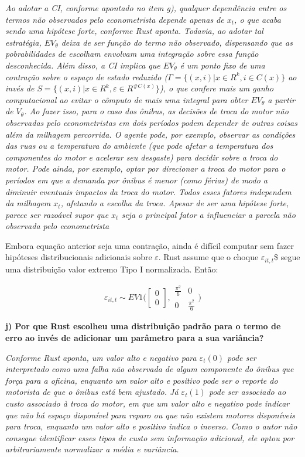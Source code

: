 \documentclass[12pt,a4paper]{article}
\begin{document}
\emph{Ao adotar a CI, conforme apontado no item g), qualquer dependência
entre os termos não observados pelo econometrista depende apenas de
\(x_t\), o que acaba sendo uma hipótese forte, conforme Rust aponta.
Todavia, ao adotar tal estratégia, \(EV_\theta\) deixa de ser função do
termo não observado, dispensando que as pobrabilidades de escolham
envolvam uma integração sobre essa função desconhecida. Além disso, a CI
implica que \(EV_\theta\) é um ponto fixo de uma contração sobre o
espaço de estado reduzido (\(\Gamma=\{(x,i)|x\in R^k, i \in C(x)\}\) ao
invés de \(S=\{(x,i)|x\in R^k, \varepsilon \in R^{\#C(x)}\}\)), o que
confere mais um ganho computacional ao evitar o cômputo de mais uma
integral para obter \(EV_\theta\) a partir de \(V_\theta\). Ao fazer
isso, para o caso dos ônibus, as decisões de troca do motor não
observadas pelo econometristas em dois períodos podem depender de outras
coisas além da milhagem percorrida. O agente pode, por exemplo, observar
as condições das ruas ou a temperatura do ambiente (que pode afetar a
temperatura dos componentes do motor e acelerar seu desgaste) para
decidir sobre a troca do motor. Pode ainda, por exemplo, optar por
direcionar a troca do motor para o períodos em que a demanda por ônibus
é menor (como férias) de modo a diminuir eventuais impactos da troca do
motor. Todos esses fatores independem da milhagem \(x_t\), afetando a
escolha da troca. Apesar de ser uma hipótese forte, parece ser razoável
supor que \(x_t\) seja o principal fator a influenciar a parcela não
observada pelo econometrista}

Embora equação anterior seja uma contração, ainda é difícil computar sem
fazer hipóteses distribucionais adicionais sobre \(\varepsilon\). Rust
assume que o choque \(\varepsilon_{it,t}\)\$ segue uma distribuição
valor extremo Tipo I normalizada. Então:

\[
\varepsilon_{it,t} \sim EV1 \Bigg( \begin{bmatrix} 
0   \\ 0 \end{bmatrix}, \begin{matrix} \frac{\pi^2}{6} & 0 \\ 0 & \frac{\pi^2}{6} \end{matrix} \Bigg) 
\]

\textbf{j) Por que Rust escolheu uma distribuição padrão para o termo de
erro ao invés de adicionar um parâmetro para a sua variância?}

\emph{Conforme Rust aponta, um valor alto e negativo para
\(\varepsilon_t(0)\) pode ser interpretado como uma falha não observada
de algum componente do ônibus que força para a oficina, enquanto um
valor alto e positivo pode ser o reporte do motorista de que o ônibus
está bem ajustado. Já \(\varepsilon_t(1)\) pode ser associado ao custo
associado à troca do motor, em que um valor alto e negativo pode indicar
que não há espaço disponível para reparo ou que não existem motores
disponíveis para troca, enquanto um valor alto e positivo indica o
inverso. Como o autor não consegue identificar esses tipos de custo sem
informação adicional, ele optou por arbitrariamente normalizar a média e
variância.}
\end{document}
